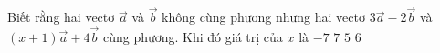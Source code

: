 
\begin{ex}%
	Biết rằng hai vectơ $\overrightarrow a $ và $\overrightarrow b $ không cùng phương nhưng hai vectơ $ 3\overrightarrow a-2\overrightarrow b $ và $ (x+1)\overrightarrow a+4\overrightarrow b $ cùng phương. Khi đó giá trị của $ x$ là 
	\choice
	{\True $-7$}
	{$ 7$}
	{$ 5$}
	{$ 6$}
\end{ex}


